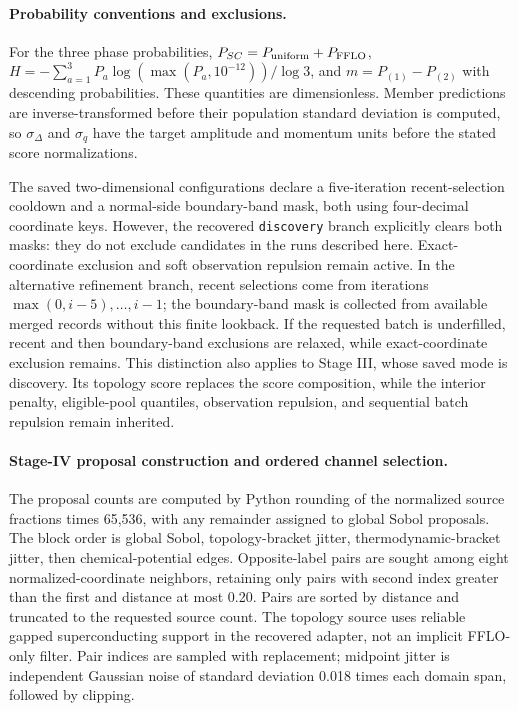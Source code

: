 \paragraph{Probability conventions and exclusions.}
For the three phase probabilities, $P_{SC}=P_{\rm uniform}+P_{\rm FFLO}$, $H=-\sum_{a=1}^{3}P_a\log(\max(P_a,10^{-12}))/\log 3$, and $m=P_{(1)}-P_{(2)}$ with descending probabilities. These quantities are dimensionless. Member predictions are inverse-transformed before their population standard deviation is computed, so $\sigma_\Delta$ and $\sigma_q$ have the target amplitude and momentum units before the stated score normalizations.

The saved two-dimensional configurations declare a five-iteration recent-selection cooldown and a normal-side boundary-band mask, both using four-decimal coordinate keys. However, the recovered \texttt{discovery} branch explicitly clears both masks: they do not exclude candidates in the runs described here. Exact-coordinate exclusion and soft observation repulsion remain active. In the alternative refinement branch, recent selections come from iterations $\max(0,i-5),\ldots,i-1$; the boundary-band mask is collected from available merged records without this finite lookback. If the requested batch is underfilled, recent and then boundary-band exclusions are relaxed, while exact-coordinate exclusion remains. This distinction also applies to Stage III, whose saved mode is discovery. Its topology score replaces the score composition, while the interior penalty, eligible-pool quantiles, observation repulsion, and sequential batch repulsion remain inherited.

\paragraph{Stage-IV proposal construction and ordered channel selection.}
The proposal counts are computed by Python rounding of the normalized source fractions times 65,536, with any remainder assigned to global Sobol proposals. The block order is global Sobol, topology-bracket jitter, thermodynamic-bracket jitter, then chemical-potential edges. Opposite-label pairs are sought among eight normalized-coordinate neighbors, retaining only pairs with second index greater than the first and distance at most 0.20. Pairs are sorted by distance and truncated to the requested source count. The topology source uses reliable gapped superconducting support in the recovered adapter, not an implicit FFLO-only filter. Pair indices are sampled with replacement; midpoint jitter is independent Gaussian noise of standard deviation 0.018 times each domain span, followed by clipping.

